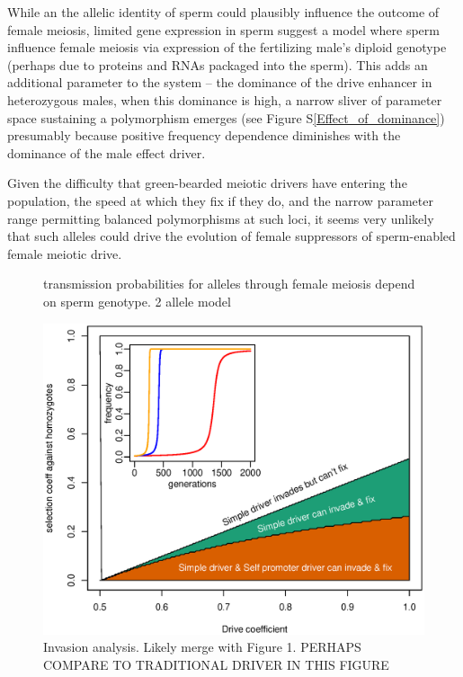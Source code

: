\documentclass[12pt,letterpaper]{article}
\newcommand{\yb}[1]{{ \color{blue} #1}}
\begin{document}
While an the allelic identity of sperm could plausibly influence the outcome of female meiosis, 
	limited gene expression in sperm \citep[e.g.][]{Joseph2004}
	suggest a model where sperm influence female meiosis via expression of the fertilizing male's
	diploid genotype (perhaps due to proteins and RNAs packaged into the sperm).
This adds an additional parameter to the system -- the dominance of the drive enhancer in heterozygous males, 
	when this dominance is high, a narrow sliver of parameter space sustaining a polymorphism emerges (see Figure S\ref{Effect_of_dominance})
 	\yb{presumably because positive frequency dependence diminishes with the dominance of the male effect driver.}

Given the difficulty that green-bearded meiotic drivers have entering the population, the speed at
which they fix if they do,
and the narrow parameter range permitting balanced polymorphisms at such loci, 
it seems very unlikely that such alleles
could drive the evolution of female suppressors of sperm-enabled
female meiotic drive.

\begin{figure}
\caption{transmission probabilities for alleles through female
  meiosis depend on sperm genotype. 2 allele model}  
\label{Eggsperm_2_allele_cartoon}
\end{figure}

\begin{figure}
\includegraphics[width = 0.8 \textwidth]{Figures/invasion_space_recessive_driver.eps}
\caption{Invasion analysis. Likely merge with Figure 1. \yb{PERHAPS COMPARE TO TRADITIONAL DRIVER IN THIS FIGURE} } \label{Invasion_space}
\end{figure}
\end{document}
